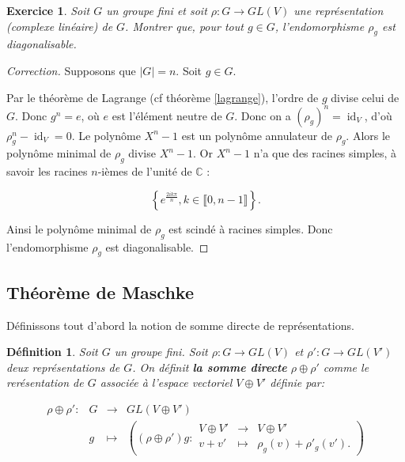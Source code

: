 \documentclass[french]{article}
\newtheorem{definition}{Définition}[section]
\newtheorem{exo}{Exercice}
\begin{document}
\begin{exo}
  Soit \(G\) un groupe fini et soit \(\rho : G \longrightarrow GL(V)\) une représentation (complexe linéaire) de \(G\). Montrer que, pour tout \(g \in G\), l'endomorphisme \(\rho_g\) est diagonalisable.
\end{exo}

\begin{proof}[Correction]
  Supposons que \(\lvert G \rvert = n\). Soit \(g \in G\).

  Par le théorème de Lagrange (cf théorème \ref{lagrange}), l'ordre de \(g\) divise celui de \(G\). Donc \(g^{n} = e\), où \(e\) est l'élément neutre de \(G\). Donc on a \((\rho_g)^{n} = \operatorname{id}_V\), d'où \(\rho_g^{n}-\operatorname{id}_V = 0\). Le polynôme \(X^{n}-1 \) est un polynôme annulateur de \(\rho_g\). Alors le polynôme minimal de \(\rho_g\) divise \(X^{n}-1\). Or \(X ^{n}-1\) n'a que des racines simples, à savoir les racines \(n\)-ièmes de l'unité de \(\mathbb{C}\) :

  \[\left\{ e^{\frac{2 i k \pi}{n}}, k \in \llbracket 0, n-1 \rrbracket \right\}.\]  %

  Ainsi le polynôme minimal de \(\rho_g\) est scindé à racines simples. Donc l'endomorphisme \(\rho_g\) est diagonalisable.
\end{proof}

\subsection{Théorème de Maschke}

Définissons tout d'abord la notion de somme directe de représentations.

\begin{definition}
  Soit \(G\) un groupe fini. Soit \(\rho : G \to GL(V)\) et \(\rho' : G \to GL(V')\) deux représentations de \(G\). On définit \textbf{la somme directe} \(\rho\oplus \rho'\) comme le rerésentation de \(G\) associée à l'espace vectoriel \(V \oplus V'\) définie par:

  \begin{equation}
    \begin{matrix}
    \rho \oplus \rho' : & G & \longrightarrow & GL(V\oplus V') \\
    \ & g & \longmapsto & \left((\rho \oplus \rho')g : \begin{matrix}
      V \oplus V' & \longrightarrow & V \oplus V' \\
      v + v' & \longmapsto & \rho_g(v) + \rho'_g(v').
    \end{matrix}\right)
    \end{matrix}
  \end{equation}
\end{definition}
\end{document}
